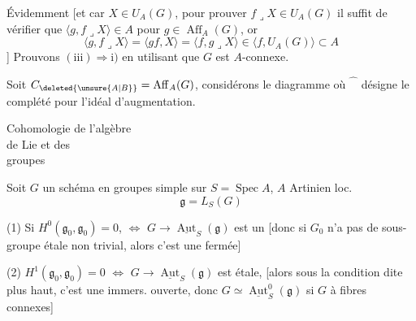 Évidemment
[et
car  $X\in U_A(G)$, pour prouver $f\mathbin{\lrcorner}X\in U_A(G)$ il suffit  de vérifier que $\langle g,f\mathbin{\lrcorner}X\rangle\in A$ pour $g\in\operatorname{Aff}_A(G)$, or
\[
\langle g,f\mathbin{\lrcorner}X\rangle=\langle gf,X\rangle=\langle f,g\mathbin{\lrcorner}X\rangle
\in\langle f,U_A(G)\rangle\subset A
\]
] Prouvons $(\mathrm{iii})\Rightarrow\mathrm{i})$ en utilisant que $G$ est $A$-connexe.

Soit $C_{\deleted{\unsure{A|B}}}=\operatorname{Aff}_A(G)$, considérons le diagramme
où $\widehat{\phantom C}$ désigne le  complété pour l'idéal d'augmentation.
\begin{flushright}
Cohomologie de l'algèbre\\
de Lie et  des\\
groupes 
\end{flushright}
Soit $G$ un schéma en groupes simple sur $S=\operatorname{Spec}A$, $A$ Artinien loc.
\[
\mathfrak g=L_S(G)
\]

(1) Si $H^0(\mathfrak g_0,\mathfrak g_0)=0$, $\Longleftrightarrow$ $G\to\underline{\operatorname{Aut}}_S(\mathfrak g)$ est un 
[donc si $G_0$ n'a pas de sous-groupe  étale  non trivial, alors c'est une  fermée]

(2)    $H^1(\mathfrak g_0,\mathfrak g_0)=0$ $\Longleftrightarrow$  $G\to\underline{\operatorname{Aut}}_S(\mathfrak g)$ est étale,
[alors sous la condition dite plus haut, c'est une immers. ouverte, donc $G\simeq\underline{\operatorname{Aut}}_S^0(\mathfrak g)$ si $G$ à fibres connexes]

